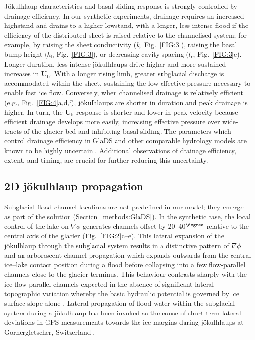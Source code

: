 \documentclass[tc, manuscript]{copernicus}
\providecommand{\DIFadd}[1]{{\protect\color{blue}\uwave{#1}}} %
\providecommand{\DIFdel}[1]{{\protect\color{red}\sout{#1}}} %
\providecommand{\DIFaddbegin}{} %
\providecommand{\DIFaddend}{} %
\providecommand{\DIFdelbegin}{} %
\providecommand{\DIFdelend}{} %
\begin{document}
Jökulhlaup characteristics and basal sliding response \DIFdelbegin \DIFdel{is }\DIFdelend \DIFaddbegin \DIFadd{are }\DIFaddend strongly controlled by drainage efficiency. In our synthetic experiments, drainage requires an increased highstand and drains to a higher lowstand, with a longer, less intense flood if the efficiency of the distributed sheet is raised relative to the channelised system; for example, by raising the sheet conductivity ($k_{\mathrm{s}}$ Fig.~\ref{FIG:3}), raising the basal bump height ($h_{\mathrm{b}}$ Fig.~\ref{FIG:3}), or decreasing cavity spacing ($l_{\mathrm{r}}$, Fig.~\ref{FIG:3}e). Longer duration, less intense jökulhlaups drive higher and more sustained increases in $\mathbf{U}_{\mathrm{b}}$. With a longer rising limb, greater subglacial discharge is accommodated within the sheet, sustaining the low effective pressure necessary to enable fast ice flow. Conversely, when channelised drainage is relatively efficient (e.g., Fig.~\ref{FIG:4}a,d,f), jökulhlaups are shorter in duration and peak drainage is higher. In turn, the $\mathbf{U}_{\mathrm{b}}$ response is shorter and lower in peak velocity because efficient drainage develops more easily, increasing effective pressure over wide-tracts of the glacier bed and inhibiting basal sliding. The parameters which control drainage efficiency in GlaDS and other comparable hydrology models are known to be highly uncertain \citep{werder2013modeling}. Additional observations of drainage efficiency, extent, and timing, are crucial for further reducing this uncertainty.

\subsection{2D jökulhlaup propagation}

Subglacial flood channel locations are not predefined in our model; they emerge as part of the solution (Section~\ref{methods:GlaDS}). In the synthetic case, the local control of the lake on $\nabla \phi$ generates channels offset by 20--40$^{\degree}$ relative to the central axis of the glacier (Fig.~\ref{FIG:2}c--e). This lateral expansion of the jökulhlaup through the subglacial system results in a distinctive pattern of $\nabla\phi$ and an arborescent channel propagation which expands outwards from the central ice--lake contact position during a flood before collapsing into a few flow-parallel channels close to the glacier terminus. This behaviour contrasts sharply with the ice-flow parallel channels expected in the absence of significant lateral topographic variation whereby the basic hydraulic potential is governed by ice surface slope alone \citep[e.g., see Figure 2 in][]{werder2013modeling}. Lateral propagation of flood water within the subglacial system during a jökulhlaup has been invoked as the cause of short-term lateral deviations in GPS measurements towards the ice-margins during jökulhlaups at Gornergletscher, Switzerland \citep{sugiyama2007reversal}.
\end{document}
